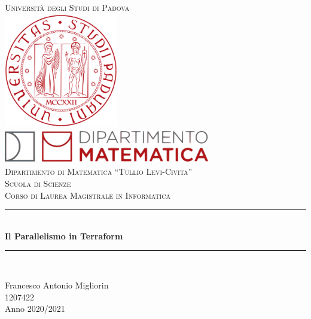 \documentclass[12pt, a4paper, titlepage]{article}
\begin{document}
\newcommand{\HRule}{\rule{\linewidth}{0.5mm}} 

\begin{center}
	
	\textsc{\LARGE Università degli Studi di Padova}\\[1cm] 
	
	\includegraphics[height=5cm]{img/UniPd.png}\\[1cm]
	
	\includegraphics[height=1.5cm, width = 9cm]{img/MathDip.png}\\
	\textsc{Dipartimento di Matematica ``Tullio Levi-Civita''}\\[1.2cm]
	\textsc{\Large Scuola di Scienze}\\[0.5cm] 
	
	\textsc{\large Corso di Laurea Magistrale in Informatica}\\[0.5cm] 
	
	\vspace{2.5cm}
	
	
	\HRule \\[0.4cm]
	{ \huge \bfseries Il Parallelismo in Terraform }\\[0.4cm]
	\HRule \\[1.5cm]
	
	
	\vspace{2.5cm}
	
	
	{\large 
		Francesco Antonio Migliorin \\ 
		1207422 \\
		Anno 2020/2021}\\[2cm]
	
	
	\vfill 
\end{center}
\tableofcontents
\newpage
\newpage
\listoffigures
\pagestyle{fancy}
\fancyhf{}
\cfoot{\thepage}
\clearpage
\end{document}
